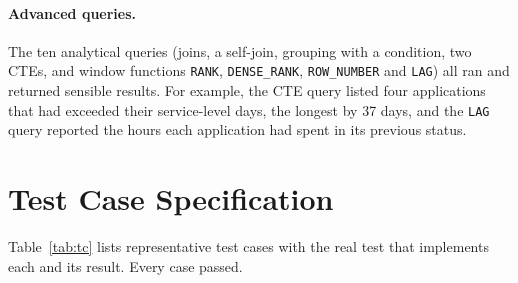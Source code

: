 \paragraph{Advanced queries.} The ten analytical queries (joins, a self-join, grouping
with a condition, two CTEs, and window functions \texttt{RANK}, \texttt{DENSE\_RANK},
\texttt{ROW\_NUMBER} and \texttt{LAG}) all ran and returned sensible results. For
example, the CTE query listed four applications that had exceeded their service-level
days, the longest by 37 days, and the \texttt{LAG} query reported the hours each
application had spent in its previous status.

\section{Test Case Specification}
Table~\ref{tab:tc} lists representative test cases with the real test that implements each
and its result. Every case passed.

